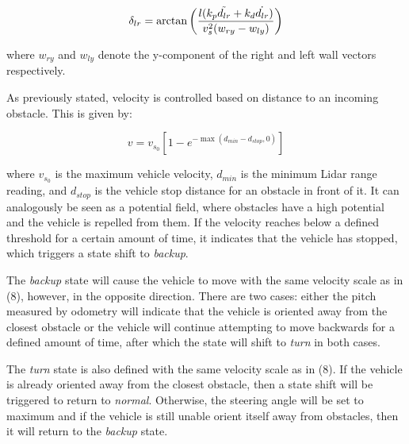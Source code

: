 \documentclass[conference]{IEEEtran}
\begin{document}
\begin{equation}
    \begin{aligned}
        \delta_{lr} = \arctan \left( \frac{l(k_p \Tilde{d_{lr}}+ k_d \dot{d_{lr}})}{v_s^2(w_{ry} - w_{ly})} \right)
    \end{aligned}
\end{equation}

where $w_{ry}$ and $w_{ly}$ denote the y-component of the right and left wall vectors respectively.  



As previously stated, velocity is controlled based on distance to an incoming obstacle. This is given by:

\begin{equation}
    v = v_{s_0}\left[1-e^{-\max(d_{min}-d_{stop},0)}\right]
\end{equation}

where $v_{s_0}$ is the maximum vehicle velocity, $d_{min}$ is the minimum Lidar range reading, and $d_{stop}$ is the vehicle stop distance for an obstacle in front of it. It can analogously be seen as a potential field, where obstacles have a high potential and  the vehicle is repelled from them. If the velocity reaches below a defined threshold for a certain amount of time, it indicates that the vehicle has stopped, which triggers a state shift to \textit{backup}. 

The \textit{backup} state will cause the vehicle to move with the same velocity scale as in (8), however, in the opposite direction. There are two cases: either the pitch measured by odometry will indicate that the vehicle is oriented away from the closest obstacle or the vehicle will continue attempting to move backwards for a defined amount of time, after which the state will shift to \textit{turn} in both cases.

The \textit{turn} state is also defined with the same velocity scale as in (8). If the vehicle is already oriented away from the closest obstacle, then a state shift will be triggered to return to \textit{normal}. Otherwise, the steering angle will be set to maximum and if the vehicle is still unable orient itself away from obstacles, then it will return to the \textit{backup} state.
\end{document}

